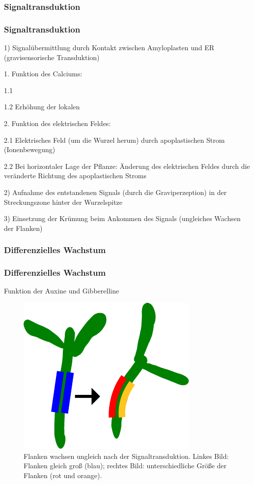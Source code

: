 \documentclass[aspectratio=169]{beamer}
\begin{document}
	\subsubsection{Signaltransduktion}
		
	\begin{frame}
		\frametitle{Signaltransduktion}
		
		1) Signalübermittlung durch Kontakt zwischen Amyloplasten und ER (gravisensorische Transduktion)
		
		1. Funktion des Calciums:
		
	    1.1 %
		
		1.2 Erhöhung der lokalen %
		
		2. Funktion des elektrischen Feldes:
		
		2.1 Elektrisches Feld (um die Wurzel herum) durch apoplastischen Strom (Ionenbewegung) 
		
		2.2 Bei horizontaler Lage der Pflanze: Änderung des elektrischen Feldes durch die veränderte Richtung des apoplastischen Stroms
		
		2) Aufnahme des entstandenen Signals (durch die Graviperzeption) in der Streckungszone hinter der Wurzelspitze
		
		3) Einsetzung der Krümung beim Ankommen des Signals (ungleiches Wachsen der Flanken)
		
		
		
	\end{frame}
			
	\subsubsection{Differenzielles Wachstum}
		
	\begin{frame}
		\frametitle{Differenzielles Wachstum}
		
		Funktion der Auxine und Gibberelline
		\begin{figure}[H]
			\centering 
			\includegraphics[width = 0.4\linewidth]{images/newdiff.pdf}
			\caption{Flanken wachsen ungleich nach der Signaltransduktion. Linkes Bild: Flanken gleich groß (blau); rechtes Bild: unterschiedliche Größe der Flanken (rot und orange).}
		\end{figure} 
	\end{frame}
\end{document}
